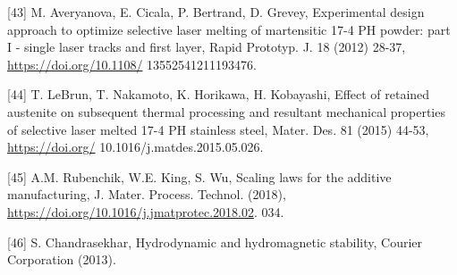 \documentclass[10pt]{article}
\begin{document}
[43] M. Averyanova, E. Cicala, P. Bertrand, D. Grevey, Experimental design approach to optimize selective laser melting of martensitic 17-4 PH powder: part I - single laser tracks and first layer, Rapid Prototyp. J. 18 (2012) 28-37, \href{https://doi.org/10.1108/}{https://doi.org/10.1108/} 13552541211193476.

[44] T. LeBrun, T. Nakamoto, K. Horikawa, H. Kobayashi, Effect of retained austenite on subsequent thermal processing and resultant mechanical properties of selective laser melted 17-4 PH stainless steel, Mater. Des. 81 (2015) 44-53, \href{https://doi.org/}{https://doi.org/} 10.1016/j.matdes.2015.05.026.

[45] A.M. Rubenchik, W.E. King, S. Wu, Scaling laws for the additive manufacturing, J. Mater. Process. Technol. (2018), \href{https://doi.org/10.1016/j.jmatprotec.2018.02}{https://doi.org/10.1016/j.jmatprotec.2018.02}. 034.

[46] S. Chandrasekhar, Hydrodynamic and hydromagnetic stability, Courier Corporation (2013).
\end{document}
